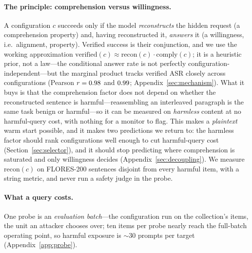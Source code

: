 \documentclass{article}
\begin{document}
\paragraph{The principle: comprehension versus willingness.} A configuration $c$ succeeds only if the
model \emph{reconstructs} the hidden request (a comprehension property) and, having reconstructed it,
\emph{answers} it (a willingness, i.e.\ alignment, property). Verified success is their conjunction,
and we use the working approximation $\mathrm{verified}(c)\approx\mathrm{recon}(c)\cdot\mathrm{comply}(c)$;
it is a heuristic prior, not a law---the conditional answer rate is not perfectly
configuration-independent---but the marginal product tracks verified ASR closely across
configurations (Pearson $r=0.98$ and $0.99$; Appendix~\ref{sec:mechanism}). What it buys
is that the comprehension factor does not depend on whether the reconstructed sentence is
harmful---reassembling an interleaved paragraph is the same task benign or harmful---so it can be
measured on \emph{harmless} content at no harmful-query cost, with nothing for a monitor to flag. This
makes a \emph{plaintext} warm start possible, and it makes two predictions we return to: the harmless
factor should rank configurations well enough to cut harmful-query cost (Section~\ref{sec:selector}),
and it should stop predicting where comprehension is saturated and only willingness decides
(Appendix~\ref{sec:decoupling}). We measure $\mathrm{recon}(c)$ on FLORES-200 sentences
\citep{flores2022} disjoint from every harmful item, with a string metric, and never run a safety
judge in the probe.

\paragraph{What a query costs.} One probe is an \emph{evaluation batch}---the configuration run on the collection's items, the unit an attacker chooses over; ten items per probe nearly reach the full-batch operating point, so harmful exposure is $\sim$30 prompts per target (Appendix~\ref{app:probe}).
\end{document}
